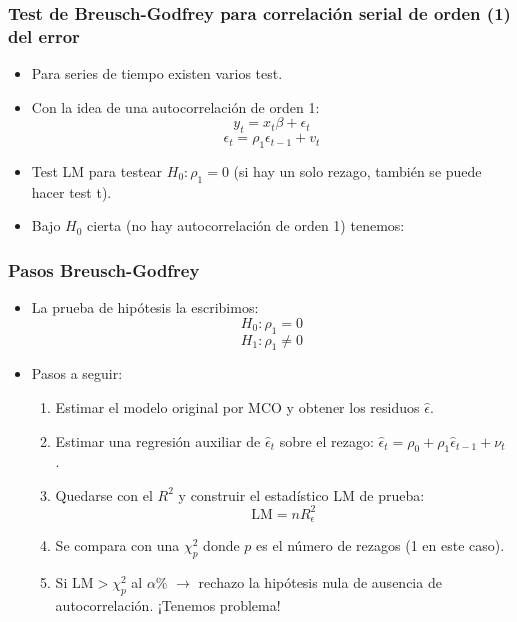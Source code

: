 \documentclass{beamer}
\begin{document}
\begin{frame}
\frametitle{Test de Breusch-Godfrey para correlación serial  de orden (1) {\bf del error}}

\begin{itemize}
  \item Para series de tiempo existen varios test.
  \item Con la idea de una autocorrelación de orden 1:
  \[
  y_t = x_t \beta + \epsilon_t
  \]
  \[
  \epsilon_t = \rho_1 \epsilon_{t-1}+v_t
  \]
  \item Test LM para testear \( H_0: \rho_1 = 0 \) (si hay un solo rezago, también se puede hacer test t).
  \item Bajo \( H_0 \) cierta (no hay autocorrelación de orden 1) tenemos:
\end{itemize}

\end{frame}
\begin{frame}
\frametitle{Pasos Breusch-Godfrey}

\begin{itemize}
  \item La prueba de hipótesis la escribimos:
  \[
  H_0 : \rho_1 = 0
  \]
  \[
  H_1 : \rho_1 \neq 0
  \]
  \item Pasos a seguir:
  \begin{enumerate}
    \item Estimar el modelo original por MCO y obtener los residuos \(\hat{\epsilon}\).
    \item Estimar una regresión auxiliar de \(\hat{\epsilon}_t\) sobre el rezago: \(\hat{\epsilon}_t = \rho_0 + \rho_1 \hat{\epsilon}_{t-1}+ \nu_t\) .
    \item Quedarse con el \(R^2\) y construir el estadístico LM de prueba:
    \[
    \text{LM} = nR^2_\epsilon
    \]
    \item Se compara con una \(\chi^2_p\) donde \(p\) es el número de rezagos (1 en este caso).
    \item Si \(\text{LM} > \chi^2_p\) al \(\alpha \%\) \(\rightarrow\) rechazo la hipótesis nula de ausencia de autocorrelación. ¡Tenemos problema!
  \end{enumerate}
\end{itemize}

\end{frame}
\end{document}
